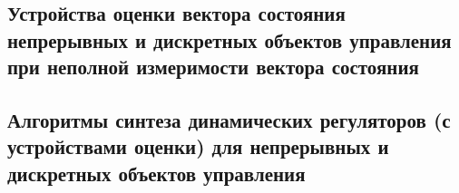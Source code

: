\subsection{Устройства оценки вектора состояния непрерывных 	и дискретных объектов управления при неполной измеримости вектора состояния}

\subsection{Алгоритмы синтеза динамических регуляторов (с устройствами оценки) для непрерывных 	и дискретных объектов управления}